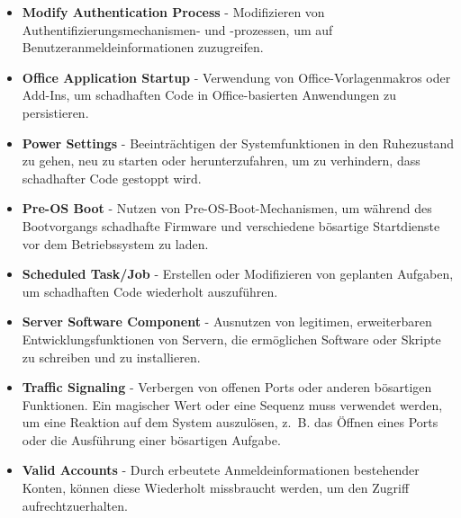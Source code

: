 \documentclass[conference]{IEEEtran}
\begin{document}
\begin{itemize}
    \item \textbf{Modify Authentication Process} - Modifizieren von Authentifizierungsmechanismen- und -prozessen, um auf Benutzeranmeldeinformationen zuzugreifen.
    \item \textbf{Office Application Startup} - Verwendung von Office-Vorlagenmakros oder Add-Ins, um schadhaften Code in Office-basierten Anwendungen zu persistieren.
    \item \textbf{Power Settings} - Beeinträchtigen der Systemfunktionen in den Ruhezustand zu gehen, neu zu starten oder herunterzufahren, um zu verhindern, dass schadhafter Code gestoppt wird.
    \item \textbf{Pre-OS Boot} - Nutzen von Pre-OS-Boot-Mechanismen, um während des Bootvorgangs schadhafte Firmware und verschiedene bösartige Startdienste vor dem Betriebssystem zu laden.
    \item \textbf{Scheduled Task/Job} - Erstellen oder Modifizieren von geplanten Aufgaben, um schadhaften Code wiederholt auszuführen.
    \item \textbf{Server Software Component} - Ausnutzen von legitimen, erweiterbaren Entwicklungsfunktionen von Servern, die ermöglichen Software oder Skripte zu schreiben und zu installieren.
    \item \textbf{Traffic Signaling} - Verbergen von offenen Ports oder anderen bösartigen Funktionen. Ein magischer Wert oder eine Sequenz muss verwendet werden, um eine Reaktion auf dem System auszulösen, z.~B. das Öffnen eines Ports oder die Ausführung einer bösartigen Aufgabe.
    \item \textbf{Valid Accounts} - Durch erbeutete Anmeldeinformationen bestehender Konten, können diese Wiederholt missbraucht werden, um den Zugriff aufrechtzuerhalten.
\end{itemize}
\end{document}
